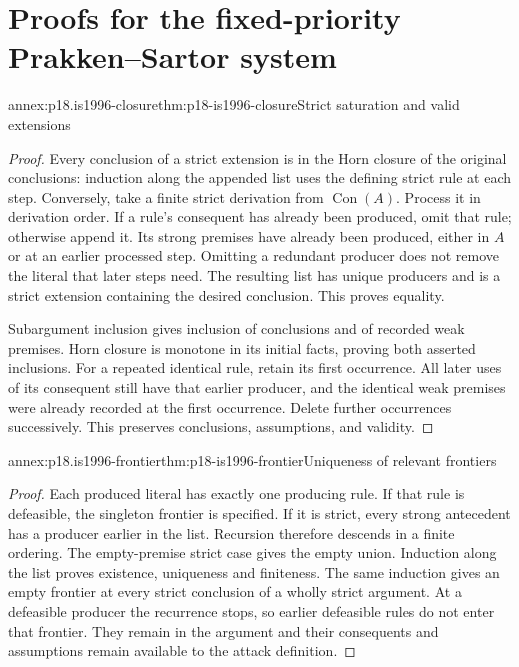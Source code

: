 \chapter{Proofs for the fixed-priority Prakken--Sartor system}
\label{annex:p18-is1996}

\begin{annexitem}{annex:p18.is1996-closure}{thm:p18-is1996-closure}{Strict saturation and valid extensions}
\begin{proof}
Every conclusion of a strict extension is in the Horn closure
of the original conclusions: induction along the appended list
uses the defining strict rule at each step.
Conversely, take a finite strict derivation from
\(\operatorname{Con}(A)\).
Process it in derivation order. If a rule's consequent has already
been produced, omit that rule; otherwise append it.
Its strong premises have already been produced, either in \(A\)
or at an earlier processed step. Omitting a redundant producer
does not remove the literal that later steps need.
The resulting list has unique producers and is a strict extension
containing the desired conclusion. This proves equality.

Subargument inclusion gives inclusion of conclusions and of recorded
weak premises. Horn closure is monotone in its initial facts,
proving both asserted inclusions.
For a repeated identical rule, retain its first occurrence.
All later uses of its consequent still have that earlier producer,
and the identical weak premises were already recorded at the
first occurrence. Delete further occurrences successively.
This preserves conclusions, assumptions, and validity.
\end{proof}
\end{annexitem}

\begin{annexitem}{annex:p18.is1996-frontier}{thm:p18-is1996-frontier}{Uniqueness of relevant frontiers}
\begin{proof}
Each produced literal has exactly one producing rule.
If that rule is defeasible, the singleton frontier is specified.
If it is strict, every strong antecedent has a producer earlier
in the list. Recursion therefore descends in a finite ordering.
The empty-premise strict case gives the empty union.
Induction along the list proves existence, uniqueness and finiteness.
The same induction gives an empty frontier at every strict
conclusion of a wholly strict argument.
At a defeasible producer the recurrence stops, so earlier
defeasible rules do not enter that frontier. They remain in
the argument and their consequents and assumptions remain
available to the attack definition.
\end{proof}
\end{annexitem}

